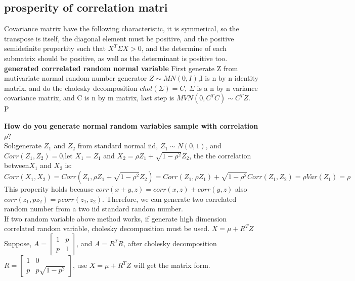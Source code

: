 \documentclass[a4paper,11pt]{article}
\begin{document}
\subsection{prosperity of correlation matri}
Covariance matrix have the following characteristic, it is symmerical, so the transpose is itself, the diagonal element must be positive, and the positive semidefinite propertity such that $X^T\Sigma X>0$, and the determine of each submatrix should be positive, as well as the determinant is positive too.\\
{\bf generated corrrelated random normal variable}
First generate Z from mutivariate normal random number generator $Z \sim MN(0,I)$,I is n by n identity matrix, and do the cholesky decomposition $chol(\Sigma)=C$, $\Sigma$ is a n by n variance covariance matrix, and C is n by m matrix, last step is $ MVN(0,C^TC) \sim C^T Z$.\\P

{\bf How do you generate normal random variables sample with correlation $\rho$}?\\
Sol:generate $Z_1$ and $Z_2$ from standard normal iid, $Z_1 \sim N(0,1)$, and $Corr(Z_1,Z_2)=0$,let $X_1=Z_1$ and $X_2=\rho Z_1+\sqrt{1-\rho^2} Z_2$, the the correlation between$X_1$ and $X_2$ is:\\
$$
Corr(X_1,X_2)=Corr(Z_1,\rho Z_1+\sqrt{1-\rho^2} Z_2)=
Corr(Z_1,\rho Z_1)+\sqrt{1-\rho^2} Corr(Z_1,Z_2)=\rho Var(Z_1)=\rho
$$
This properity holds because $corr(x+y,z)=corr(x,z)+corr(y,z)$ also $corr(z_1,pz_2)=pcorr(z_1,z_2)$. Therefore, we can generate two correlated random number from a two iid standard random number.\\
If two random variable above method works, if generate high dimension correlated random variable, cholesky decomposition must be used. $X=\mu +R^T Z$\\
Suppose, $A=\begin{bmatrix} 1 & p \\ p & 1 \end{bmatrix}$, and $A=R^T R$, after cholesky decomposition $R=\begin{bmatrix} 1 & 0 \\ p & p\sqrt{1-p^2} \end{bmatrix}$, use $X=\mu +R^T Z$ will get the matrix form.\\
\end{document}
